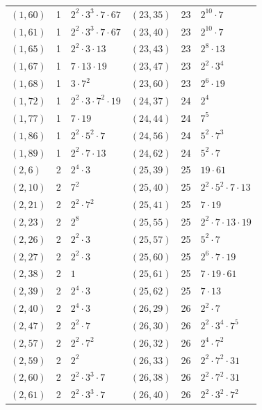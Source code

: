 \documentclass[11pt]{article}
\begin{document}
\begin{longtable}{@{}lrl@{\qquad}lrl@{}}
$(1,60)$ & 1 & $2^{2}\cdot 3^{3}\cdot 7\cdot 67$ & $(23,35)$ & 23 & $2^{10}\cdot 7$\\
$(1,61)$ & 1 & $2^{2}\cdot 3^{3}\cdot 7\cdot 67$ & $(23,40)$ & 23 & $2^{10}\cdot 7$\\
$(1,65)$ & 1 & $2^{2}\cdot 3\cdot 13$ & $(23,43)$ & 23 & $2^{8}\cdot 13$\\
$(1,67)$ & 1 & $7\cdot 13\cdot 19$ & $(23,47)$ & 23 & $2^{2}\cdot 3^{4}$\\
$(1,68)$ & 1 & $3\cdot 7^{2}$ & $(23,60)$ & 23 & $2^{6}\cdot 19$\\
$(1,72)$ & 1 & $2^{2}\cdot 3\cdot 7^{2}\cdot 19$ & $(24,37)$ & 24 & $2^{4}$\\
$(1,77)$ & 1 & $7\cdot 19$ & $(24,44)$ & 24 & $7^{5}$\\
$(1,86)$ & 1 & $2^{2}\cdot 5^{2}\cdot 7$ & $(24,56)$ & 24 & $5^{2}\cdot 7^{3}$\\
$(1,89)$ & 1 & $2^{2}\cdot 7\cdot 13$ & $(24,62)$ & 24 & $5^{2}\cdot 7$\\
$(2,6)$ & 2 & $2^{4}\cdot 3$ & $(25,39)$ & 25 & $19\cdot 61$\\
$(2,10)$ & 2 & $7^{2}$ & $(25,40)$ & 25 & $2^{2}\cdot 5^{2}\cdot 7\cdot 13$\\
$(2,21)$ & 2 & $2^{2}\cdot 7^{2}$ & $(25,41)$ & 25 & $7\cdot 19$\\
$(2,23)$ & 2 & $2^{8}$ & $(25,55)$ & 25 & $2^{2}\cdot 7\cdot 13\cdot 19$\\
$(2,26)$ & 2 & $2^{2}\cdot 3$ & $(25,57)$ & 25 & $5^{2}\cdot 7$\\
$(2,27)$ & 2 & $2^{2}\cdot 3$ & $(25,60)$ & 25 & $2^{6}\cdot 7\cdot 19$\\
$(2,38)$ & 2 & $1$ & $(25,61)$ & 25 & $7\cdot 19\cdot 61$\\
$(2,39)$ & 2 & $2^{4}\cdot 3$ & $(25,62)$ & 25 & $7\cdot 13$\\
$(2,40)$ & 2 & $2^{4}\cdot 3$ & $(26,29)$ & 26 & $2^{2}\cdot 7$\\
$(2,47)$ & 2 & $2^{2}\cdot 7$ & $(26,30)$ & 26 & $2^{2}\cdot 3^{4}\cdot 7^{5}$\\
$(2,57)$ & 2 & $2^{2}\cdot 7^{2}$ & $(26,32)$ & 26 & $2^{4}\cdot 7^{2}$\\
$(2,59)$ & 2 & $2^{2}$ & $(26,33)$ & 26 & $2^{2}\cdot 7^{2}\cdot 31$\\
$(2,60)$ & 2 & $2^{2}\cdot 3^{3}\cdot 7$ & $(26,38)$ & 26 & $2^{2}\cdot 7^{2}\cdot 31$\\
$(2,61)$ & 2 & $2^{2}\cdot 3^{3}\cdot 7$ & $(26,40)$ & 26 & $2^{2}\cdot 3^{2}\cdot 7^{2}$\\

\end{longtable}
\end{document}
